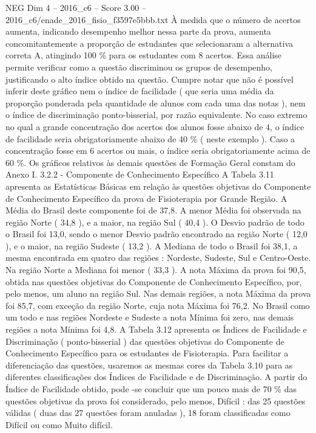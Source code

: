 \begin{textsample}{NEG Dim 4 – 2016\_c6 – Score 3.00 – 2016\_c6/enade\_2016\_fisio\_f3597e5bbb.txt}
À medida que o número de acertos aumenta, indicando desempenho melhor nessa parte da prova, aumenta concomitantemente a proporção de estudantes que selecionaram a alternativa correta A, atingindo 100 \% para os estudantes com 8 acertos.
Essa análise permite verificar como a questão discriminou os grupos de desempenho, justificando o alto índice obtido na questão.
Cumpre notar que não é possível inferir deste gráfico nem o índice de facilidade ( que seria uma média da proporção ponderada pela quantidade de alunos com cada uma das notas ), nem o índice de discriminação ponto-bisserial, por razão equivalente.
No caso extremo no qual a grande concentração dos acertos dos alunos fosse abaixo de 4, o índice de facilidade seria obrigatoriamente abaixo de 40 \% ( neste exemplo ).
Caso a concentração fosse em 6 acertos ou mais, o índice seria obrigatoriamente acima de 60 \%.
Os gráficos relativos às demais questões de Formação Geral constam do Anexo I. 3.2.2 - Componente de Conhecimento Específico A Tabela 3.11 apresenta as Estatísticas Básicas em relação às questões objetivas do Componente de Conhecimento Específico da prova de Fisioterapia por Grande Região.
A Média do Brasil deste componente foi de 37,8.
A menor Média foi observada na região Norte ( 34,8 ), e a maior, na região Sul ( 40,4 ).
O Desvio padrão de todo o Brasil foi 13,0, sendo o menor Desvio padrão encontrado na região Norte ( 12,0 ), e o maior, na região Sudeste ( 13,2 ).
A Mediana de todo o Brasil foi 38,1, a mesma encontrada em quatro das regiões : Nordeste, Sudeste, Sul e Centro-Oeste.
Na região Norte a Mediana foi menor ( 33,3 ).
A nota Máxima da prova foi 90,5, obtida nas questões objetivas do Componente de Conhecimento Específico, por, pelo menos, um aluno na região Sul.
Nas demais regiões, a nota Máxima da prova foi 85,7, com exceção da região Norte, cuja nota Máxima foi 76,2.
No Brasil como um todo e nas regiões Nordeste e Sudeste a nota Mínima foi zero, nas demais regiões a nota Mínima foi 4,8.
A Tabela 3.12 apresenta os Índices de Facilidade e Discriminação ( ponto-bisserial ) das questões objetivas do Componente de Conhecimento Específico para os estudantes de Fisioterapia.
Para facilitar a diferenciação das questões, usaremos as mesmas cores da Tabela 3.10 para as diferentes classificações dos Índices de Facilidade e de Discriminação.
A partir do Índice de Facilidade obtido, pode -se concluir que um pouco mais de 70 \% das questões objetivas da prova foi considerado, pelo menos, Difícil : das 25 questões válidas ( duas das 27 questões foram anuladas ), 18 foram classificadas como Difícil ou como Muito difícil.

\end{textsample}

